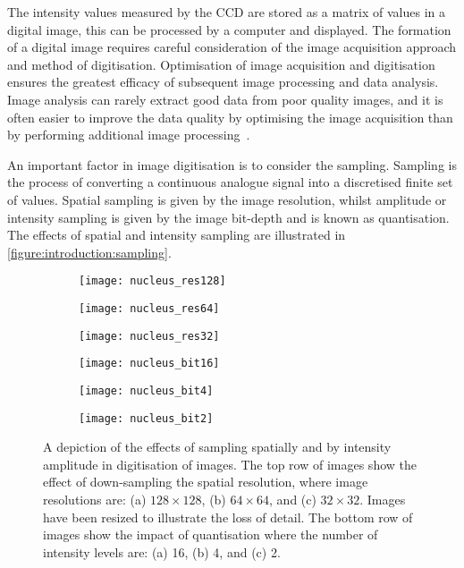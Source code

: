The intensity values measured by the CCD are stored as a matrix of values in a digital image, this can be processed by a computer and displayed. The formation of a digital image requires careful consideration of the image acquisition approach and method of digitisation. Optimisation of image acquisition and digitisation ensures the greatest efficacy of subsequent image processing and data analysis. Image analysis can rarely extract good data from poor quality images, and it is often easier to improve the data quality by optimising the image acquisition than by performing additional image processing~\cite{Roeder2012}.

An important factor in image digitisation is to consider the sampling. Sampling is the process of converting a continuous analogue signal into a discretised finite set of values. Spatial sampling is given by the image resolution, whilst amplitude or intensity sampling is given by the image bit-depth and is known as quantisation. The effects of spatial and intensity sampling are illustrated in \autoref{figure:introduction:sampling}.

\begin{figure}[htbp!]\centering
	\begin{subfigure}[b]{0.32\linewidth}
		\centering
		\texttt{[image: nucleus\_res128]}
		\caption{}
		\label{figure:introduction:sampling:res128}
	\end{subfigure}
	\begin{subfigure}[b]{0.32\linewidth}
		\centering
		\texttt{[image: nucleus\_res64]}
		\caption{}
		\label{figure:introduction:sampling:res64}
	\end{subfigure}
	\begin{subfigure}[b]{0.32\linewidth}
		\centering
		\texttt{[image: nucleus\_res32]}
		\caption{}
		\label{figure:introduction:sampling:res32}
	\end{subfigure}
	\begin{subfigure}[b]{0.32\linewidth}
		\centering
		\texttt{[image: nucleus\_bit16]}
		\caption{}
		\label{figure:introduction:sampling:bit16}
	\end{subfigure}
	\begin{subfigure}[b]{0.32\linewidth}
		\centering
		\texttt{[image: nucleus\_bit4]}
		\caption{}
		\label{figure:introduction:sampling:bit4}
	\end{subfigure}
	\begin{subfigure}[b]{0.32\linewidth}
		\centering
		\texttt{[image: nucleus\_bit2]}
		\caption{}
		\label{figure:introduction:sampling:bit2}
	\end{subfigure}
\caption[Sampling in digitisation]{A depiction of the effects of sampling spatially and by intensity amplitude in digitisation of images. The top row of images show the effect of down-sampling the spatial resolution, where image resolutions are: (a) $128 \times 128$, (b) $64 \times 64$, and (c) $32 \times 32$. Images have been resized to illustrate the loss of detail. The bottom row of images show the impact of quantisation where the number of intensity levels are: (a) 16, (b) 4, and (c) 2.}
\label{figure:introduction:sampling}
\end{figure}

